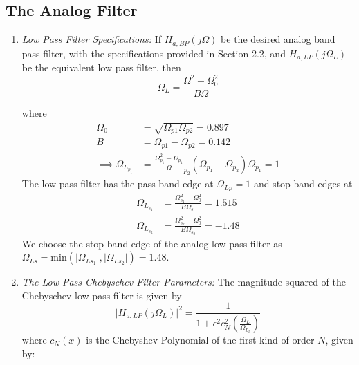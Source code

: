 \documentclass{article}
\begin{document}
\subsection{The Analog Filter}
\begin{enumerate}

\item {\em Low Pass Filter Specifications:}  If $H_{a, BP}(j\Omega)$ be the desired analog band
pass filter,  with the specifications provided in Section 2.2, and $H_{a,LP}(j\Omega_L)$ 
be the equivalent low pass filter, then
\begin{equation}
\label{transition}
\Omega_L = \frac{\Omega^2 - \Omega_0^2}{B\Omega}
\end{equation}

where 
\begin{align*}
\Omega_0 &= \sqrt{\Omega_{p1}\Omega_{p2}} = 0.897\\
B &= \Omega_{p1} - \Omega_{p2} = 0.142\\
	\implies \Omega_{L_{p_1}} &= \frac{\Omega_{p_1}^2 - \Omega_{p_1}}\Omega_{p_2}{(\Omega_{p_1} - \Omega_{p_2})\Omega_{p_1}} = 1
\end{align*}
The low pass filter has
the pass-band edge at $\Omega_{Lp} = 1$ and stop-band edges at 
\begin{align*}
    \Omega_{L_{s_1}} &= \frac{\Omega_{s_1}^2 - \Omega_0^2}{B\Omega_{s_1}} =  1.515\\
    \Omega_{L_{s_2}} &= \frac{\Omega_{s_2}^2 - \Omega_0^2}{B\Omega_{s_2}} = -1.48
\end{align*}
We choose the stop-band edge of the analog low pass filter as $\Omega_{Ls} = \mbox{min}(\vert \Omega_{Ls_1}\vert,\vert \Omega_{Ls_2}\vert) = 1.48$.

\item {\em The Low Pass Chebyschev Filter Parameters:}  The magnitude squared of the Chebyschev low pass filter is given by 
\begin{equation}
\label{lpfirst}
\vert H_{a,LP}(j\Omega_L)\vert^2 = \frac{1}{1 + \epsilon^2c_N^2\left(\frac{\Omega_L}{\Omega_{L_p}}\right)}
\end{equation}
where $c_N(x)$ is the Chebyshev Polynomial of the first kind of order $N$, given by:


\end{enumerate}
\end{document}
